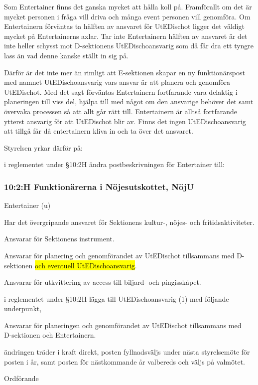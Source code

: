 \documentclass[../_main/handlingar.tex]{subfiles}
\begin{document}


Som Entertainer finns det ganska mycket att hålla koll på. Framförallt om det är mycket personen i fråga vill driva och många event personen vill genomföra. Om Entertainern förväntas ta hälften av ansvaret för UtEDischot ligger det väldigt mycket på Entertainerns axlar. Tar inte Entertainern hälften av ansvaret är det inte heller schysst mot D-sektionens UtEDischoansvarig som då får dra ett tyngre lass än vad denne kanske ställt in sig på. 

Därför är det inte mer än rimligt att E-sektionen skapar en ny funktionärspost med namnet UtEDischoansvarig vars ansvar är att planera och genomföra UtEDischot. Med det sagt förväntas Entertainern fortfarande vara delaktig i planeringen till viss del, hjälpa till med något om den ansvarige behöver det samt övervaka processen så att allt går rätt till. Entertainern är alltså fortfarande ytterst ansvarig för att UtEDischot blir av. Finns det ingen UtEDischoansvarig att tillgå får då entertainern kliva in och ta över det ansvaret. 

Styrelsen yrkar därför på: 

\begin{attsatser}
    \att i reglementet under \S10:2H ändra postbeskrivningen för Entertainer till:
    \subsubsection*{10:2:H Funktionärerna i Nöjesutskottet, NöjU}

    \begin{emptylist}
    \item Entertainer (u)
        \begin{dashlist}
          \item Har det övergripande ansvaret för Sektionens kultur-, nöjes- och fritidsaktiviteter.
          \item Ansvarar för Sektionens instrument.
          \item Ansvarar för planering och genomförandet av UtEDischot tillsammans med D-sektionen \hl{och eventuell UtEDischoansvarig}.
          \item Ansvarar för utkvittering av access till biljard- och pingisskåpet.
        \end{dashlist}
        \end{emptylist}
        \changenote
    \att i reglementet under \S10:2H lägga till UtEDischoansvarig (1) med följande underpunkt,
    \begin{itemizedash}
        \item Ansvarar för planeringen och genomförandet av UtEDischot tillsammans med \\D-sektionen och Entertainern.
    \end{itemizedash}
    \att ändringen träder i kraft direkt,
    \att posten fyllnadsväljs under nästa styrelsemöte för posten i år, samt
    \att posten för nästkommande år valbereds och väljs på valmötet. 

\end{attsatser}

\begin{signatures}{1}
    \ist
    \signature{\ordf}{Ordförande}
\end{signatures}
\end{document}
